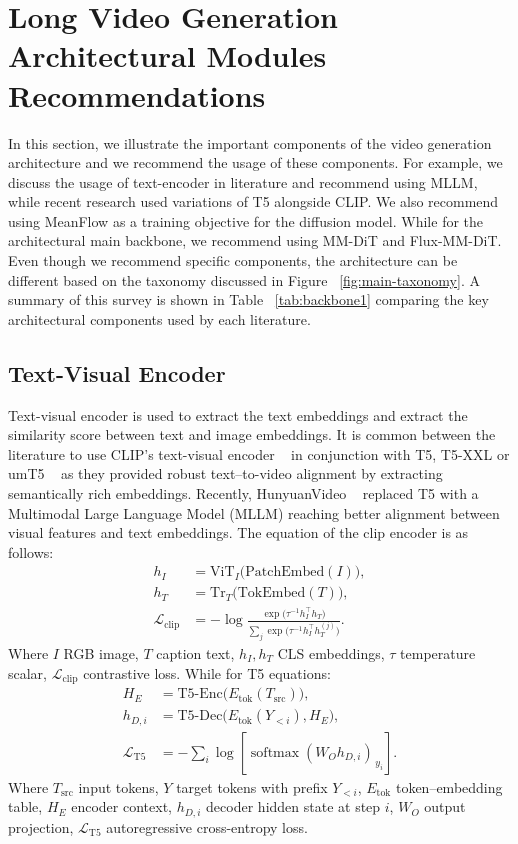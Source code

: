 \section{Long Video Generation Architectural Modules Recommendations}
\label{sec:architecture}

In this section, we illustrate the important components of the video generation architecture and we recommend the usage of these components. For example, we discuss the usage of text-encoder in literature and recommend using MLLM, while recent research used variations of T5 alongside CLIP. We also recommend using MeanFlow as a training objective for the diffusion model. While for the architectural main backbone, we recommend using MM-DiT and Flux-MM-DiT. Even though we recommend specific components, the architecture can be different based on the taxonomy discussed in Figure ~\ref{fig:main-taxonomy}. A summary of this survey is shown in Table ~\ref{tab:backbone1} comparing the key architectural components used by each literature.


\subsection{Text-Visual Encoder}
Text-visual encoder is used to extract the text embeddings and extract the similarity score between text and image embeddings. It is common between the literature to use CLIP’s text-visual encoder ~\cite{clip2021} in conjunction with T5, T5-XXL or umT5 ~\cite{t5-2019, umt5-2023, t5-xxl-2024} as they provided robust text–to-video alignment by extracting semantically rich embeddings. Recently, HunyuanVideo ~\cite{kong2024hunyuanvideo} replaced T5 with a Multimodal Large Language Model (MLLM) reaching better alignment between visual features and text embeddings. The equation of the clip encoder is as follows:
\begin{align}
h_I &= \mathrm{ViT}_I\!\bigl(\mathrm{PatchEmbed}(I)\bigr), \\
h_T &= \mathrm{Tr}_T\!\bigl(\mathrm{TokEmbed}(T)\bigr), \\
\mathcal{L}_{\text{clip}} &=
-\log\frac{\exp\bigl(\tau^{-1}h_I^{\!\top}h_T\bigr)}
     {\sum_{j}\exp\bigl(\tau^{-1}h_I^{\!\top}h_{T}^{(j)}\bigr)} .
\end{align}
Where $I$ RGB image, $T$ caption text, $h_I,h_T$ CLS embeddings, $\tau$ temperature scalar, $\mathcal{L}_{\text{clip}}$ contrastive loss. 
While for T5 equations:
\begin{align}
H_E &= \mathrm{T5\text{-}Enc}\!\bigl(E_{\text{tok}}(T_{\text{src}})\bigr), \\
h_{D,i} &= \mathrm{T5\text{-}Dec}\!\bigl(E_{\text{tok}}(Y_{<i}),H_E\bigr), \\
\mathcal{L}_{\text{T5}} &=
-\sum_{i}\log\!\left[\operatorname{softmax}(W_O h_{D,i})_{\,y_i}\right].
\end{align}
Where $T_{\text{src}}$ input tokens, $Y$ target tokens with prefix $Y_{<i}$, $E_{\text{tok}}$ token–embedding table, $H_E$ encoder context, $h_{D,i}$ decoder hidden state at step $i$, $W_O$ output projection, $\mathcal{L}_{\text{T5}}$ autoregressive cross-entropy loss.

